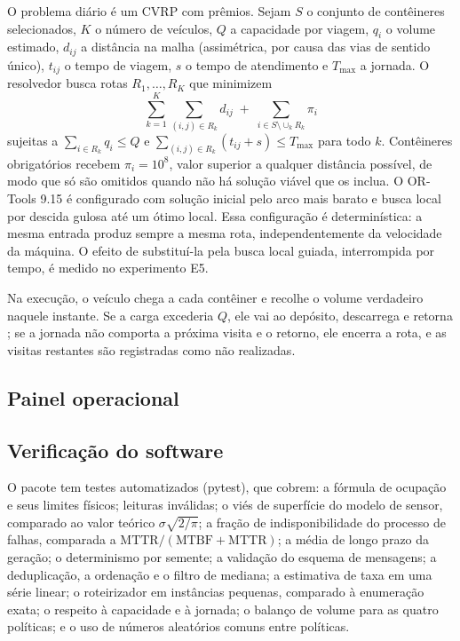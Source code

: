 O problema diário é um CVRP com prêmios. Sejam $S$ o conjunto de contêineres
selecionados, $K$ o número de veículos, $Q$ a capacidade por viagem, $q_i$ o
volume estimado, $d_{ij}$ a distância na malha (assimétrica, por causa das vias
de sentido único), $t_{ij}$ o tempo de viagem, $s$ o tempo de atendimento e
$T_{\max}$ a jornada. O resolvedor busca rotas $R_1,\dots,R_K$ que minimizem
\begin{equation}
  \sum_{k=1}^{K}\sum_{(i,j)\in R_k} d_{ij} \;+\; \sum_{i\in S\setminus \cup_k R_k} \pi_i
  \label{eq:objetivo}
\end{equation}
sujeitas a $\sum_{i\in R_k} q_i \le Q$ e $\sum_{(i,j)\in R_k}(t_{ij}+s) \le
T_{\max}$ para todo $k$. Contêineres obrigatórios recebem $\pi_i = 10^8$,
valor superior a qualquer distância possível, de modo que só são omitidos
quando não há solução viável que os inclua. O OR-Tools 9.15 é configurado com
solução inicial pelo arco mais barato e busca local por descida gulosa até um
ótimo local. Essa configuração é determinística: a mesma entrada produz sempre
a mesma rota, independentemente da velocidade da máquina. O efeito de
substituí-la pela busca local guiada, interrompida por tempo, é medido no
experimento E5.

Na execução, o veículo chega a cada contêiner e recolhe o volume verdadeiro
naquele instante. Se a carga excederia $Q$, ele vai ao depósito, descarrega e
retorna \cite{dror1989vehicle}; se a jornada não comporta a próxima visita e o
retorno, ele encerra a rota, e as visitas restantes são registradas como não
realizadas.

\subsection{Painel operacional}\label{sec:painel}



\subsection{Verificação do software}

O pacote tem \NTestes{} testes automatizados (pytest), que cobrem: a fórmula de
ocupação e seus limites físicos; leituras inválidas; o viés de superfície do
modelo de sensor, comparado ao valor teórico $\sigma\sqrt{2/\pi}$; a fração de
indisponibilidade do processo de falhas, comparada a
$\mathrm{MTTR}/(\mathrm{MTBF}+\mathrm{MTTR})$; a média de longo prazo da
geração; o determinismo por semente; a validação do esquema de mensagens; a
deduplicação, a ordenação e o filtro de mediana; a estimativa de taxa em uma
série linear; o roteirizador em instâncias pequenas, comparado à enumeração
exata; o respeito à capacidade e à jornada; o balanço de volume para as quatro
políticas; e o uso de números aleatórios comuns entre políticas.
